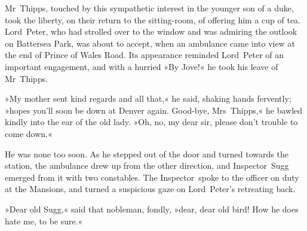 Mr~Thipps, touched by this sympathetic interest in the younger son of a duke, took the liberty, on their return to the sitting-room, of offering him a cup of tea. Lord~Peter, who had strolled over to the window and was admiring the outlook on Battersea Park, was about to accept, when an ambulance came into view at the end of Prince of Wales Road. Its appearance reminded Lord~Peter of an important engagement, and with a hurried »By Jove!« he took his leave of Mr~Thipps.

»My mother sent kind regards and all that,« he said, shaking hands fervently; »hopes you'll soon be down at Denver again. Good-bye, Mrs~Thipps,« he bawled kindly into the ear of the old lady. »Oh, no, my dear sir, please don't trouble to come down.«

He was none too soon. As he stepped out of the door and turned towards the station, the ambulance drew up from the other direction, and Inspector~Sugg emerged from it with two constables. The Inspector~spoke to the officer on duty at the Mansions, and turned a suspicious gaze on Lord~Peter's retreating back.

»Dear old Sugg,« said that nobleman, fondly, »dear, dear old bird! How he does hate me, to be sure.«